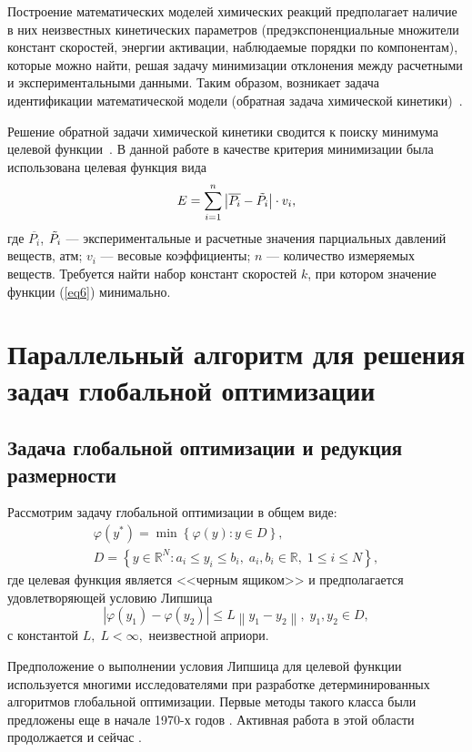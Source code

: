 \documentclass{cmi}
\begin{document}
Построение математических моделей химических реакций предполагает наличие в них неизвестных кинетических параметров (предэкспоненциальные множители констант скоростей, энергии активации, наблюдаемые порядки по компонентам), которые можно найти, решая задачу минимизации отклонения между расчетными и экспериментальными данными. Таким образом, возникает задача идентификации математической модели (обратная задача химической кинетики)~\cite{GubaidullinRT11:ru,MorlanesLYMC2022,WooPBP2023}.

Решение обратной задачи химической кинетики сводится к поиску минимума целевой функции~\cite{MazitovOAG16:ru}. В данной работе в качестве критерия минимизации была использована целевая функция вида
\begin{equation}\label{eq6}
E=\sum_{i=1}^n \left|\overline{P_{i}}-\Tilde{P_{i}}\right|\cdot v_{i},
\end{equation}
где $\overline{P_{i}}$, $\Tilde{P_{i}}$ --- экспериментальные и расчетные значения парциальных давлений веществ, атм; $v_{i}$ --- весовые коэффициенты; $n$ --- количество измеряемых веществ.
Требуется найти набор констант скоростей $k$, при котором значение функции (\ref{eq6}) минимально.

\section{Параллельный алгоритм для решения задач глобальной оптимизации} \label{sec-PGSA}
\subsection{Задача глобальной оптимизации и редукция размерности}

Рассмотрим задачу глобальной оптимизации в общем виде:
\begin{gather}
 \varphi(y^\ast)=\min{\left\{\varphi(y):y\in D\right\}}, \label{problem}\\
 D=\left\{y\in \mathbb{R}^N: a_i\leq y_i \leq b_i, \; a_i,b_i\in \mathbb{R}, \;  1\leq i \leq N\right\} \label{D},
\end{gather}
где целевая функция является <<черным ящиком>> и предполагается удовлетворяющей условию Липшица
\[
\left|\varphi(y_1)-\varphi(y_2)\right|\leq L\left\|y_1-y_2\right\|,\; y_1,y_2 \in D,
\]
с константой $L, \; L<\infty,$ неизвестной априори.

Предположение о выполнении условия Липшица для целевой функции используется многими исследователями при разработке детерминированных алгоритмов глобальной оптимизации.
Первые методы такого класса были предложены еще в начале 1970-х годов \cite{Piyavskii1972,Shubert1972}. Активная работа в этой области продолжается и сейчас \cite{Evtushenko2013,Zilinskas2010,Pinter1996,Jones2009}.
\end{document}
